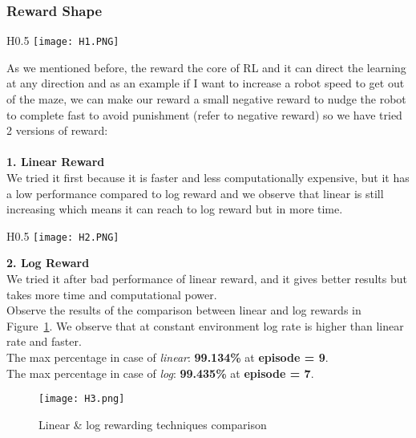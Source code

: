 \subsubsection{Reward Shape}
\begin{wrapfigure}{H}{0.5\textwidth}
    \texttt{[image: H1.PNG]}
    \caption{Achievable linear reward}
    \label{fig:linear reward}
\end{wrapfigure}
As we mentioned before, the reward the core of RL and it can direct the learning at any direction and as an example if I want to increase a robot speed to get out of the maze, we can make our reward a small negative reward to nudge the robot to complete fast to avoid punishment (refer to negative reward) so we have tried 2 versions of reward:\\\\
\textbf{1. Linear Reward} \\
We tried it first because it is faster and less computationally expensive, but it has a low performance compared to log reward and we observe that linear is still increasing which means it can reach to log reward but in more time.\\

\begin{wrapfigure}{H}{0.5\textwidth}
    \texttt{[image: H2.PNG]}
    \caption{Achievable log reward}
    \label{fig:log reward}
\end{wrapfigure}
\textbf{2. Log Reward} \\
We tried it after bad performance of linear reward, and it gives better results but takes more time and computational power. \\

Observe the results of the comparison between linear and log rewards in Figure~\ref{fig:log and linear}. We observe that at constant environment log rate is higher than linear rate and faster. \\
The max percentage in case of \emph{linear}: \textbf{99.134\%} at \textbf{episode = 9}.\\
The max percentage in case of \emph{log}: \textbf{99.435\%} at \textbf{episode = 7}.

\begin{figure}[ht]
    \centering
    \texttt{[image: H3.png]}
    \caption{Linear \& log rewarding techniques comparison}
    \label{fig:log and linear}
\end{figure}


